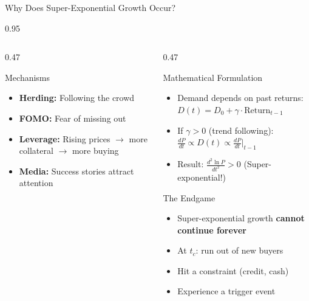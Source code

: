 \documentclass[9pt, aspectratio=169, t]{beamer}
\begin{document}
\begin{frame}{Why Does Super-Exponential Growth Occur?}
\begin{cminipage}{0.95\textwidth}
{\begin{columns}[T]
\begin{column}{0.47\textwidth}
            \begin{alertblock}{Mechanisms}
                \begin{itemize}\setlength{\itemsep}{0pt}
                    \item \textbf{Herding:} Following the crowd
                    \item \textbf{FOMO:} Fear of missing out
                    \item \textbf{Leverage:} Rising prices $\to$ more collateral $\to$ more buying
                    \item \textbf{Media:} Success stories attract attention
                \end{itemize}
            \end{alertblock}
        \end{column}
        \begin{column}{0.47\textwidth}
            \begin{exampleblock}{Mathematical Formulation}
                \begin{itemize}\setlength{\itemsep}{1pt}
                    \item Demand depends on past returns: $D(t) = D_0 + \gamma \cdot \text{Return}_{t-1}$
                    \item If $\gamma > 0$ (trend following): $\frac{dP}{dt} \propto D(t) \propto \frac{dP}{dt}\big|_{t-1}$
                    \item Result: $\frac{d^2 \ln P}{dt^2} > 0$ (Super-exponential!)
                \end{itemize}
            \end{exampleblock}

            \begin{block}{The Endgame}
                \begin{itemize}\setlength{\itemsep}{0pt}
                    \item Super-exponential growth \textbf{cannot continue forever}
                    \item At $t_c$: run out of new buyers
                    \item Hit a constraint (credit, cash)
                    \item Experience a trigger event
                \end{itemize}
            \end{block}
        \end{column}
    \end{columns}
    }
    \end{cminipage}
\end{frame}
\end{document}
